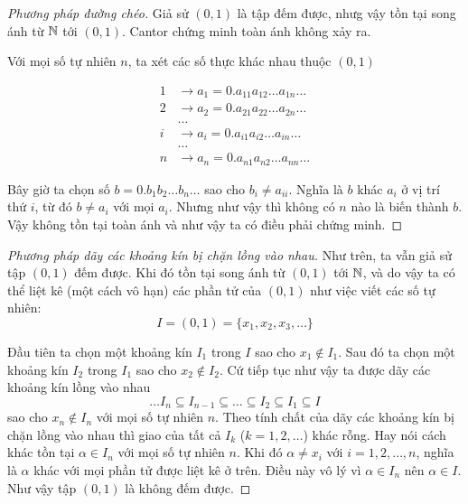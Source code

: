 \begin{proof}[Phương pháp đường chéo]
    Giả sử $(0, 1)$ là tập đếm được, nhưg vậy tồn tại song ánh từ $\mathbb{N}$ tới $(0, 1)$.
    Cantor chứng minh toàn ánh không xảy ra.

    Với mọi số tự nhiên $n$, ta xét các số thực khác nhau thuộc $(0, 1)$

    \begin{align*}
        1 & \to a_1 = 0.a_{11} a_{12} \ldots a_{1n} \ldots \\
        2 & \to a_2 = 0.a_{21} a_{22} \ldots a_{2n} \ldots \\
        & \ldots \\
        i & \to a_i = 0.a_{i1} a_{i2} \ldots a_{in} \ldots \\
        & \ldots \\
        n & \to a_n = 0.a_{n1} a_{n2} \ldots a_{nn} \ldots
    \end{align*}

    Bây giờ ta chọn số $b = 0.b_1 b_2 \ldots b_n \ldots$ sao cho
    $b_i \neq a_{ii}$. Nghĩa là $b$ khác $a_i$ ở vị trí thứ $i$,
    từ đó $b \neq a_i$ với mọi $a_i$.
    Nhưng như vậy thì không có $n$ nào là biến thành $b$. Vậy không tồn
    tại toàn ánh và như vậy ta có điều phải chứng minh.
\end{proof}

\begin{proof}[Phương pháp dãy các khoảng kín bị chặn lồng vào nhau]
    Như trên, ta vẫn giả sử tập $(0, 1)$ đếm được. Khi đó tồn tại song ánh
    từ $(0, 1)$ tới $\mathbb{N}$, và do vậy ta có thể liệt kê (một cách vô hạn)
    các phần tử của $(0, 1)$ như việc viết các số tự nhiên:
    \[I = (0, 1) = \{x_1, x_2, x_3, \ldots \}\]

    Đầu tiên ta chọn một khoảng kín $I_1$ trong $I$ sao cho $x_1 \not\in I_1$.
    Sau đó ta chọn một khoảng kín $I_2$ trong $I_1$ sao cho $x_2 \not\in I_2$.
    Cứ tiếp tục như vậy ta được dãy các khoảng kín lồng vào nhau
    \[ \ldots I_n \subseteq I_{n-1} \subseteq \ldots \subseteq I_2 \subseteq I_1 \subseteq I\]
    sao cho $x_n \not\in I_n$ với mọi số tự nhiên $n$. Theo tính chất của dãy 
    các khoảng kín bị chặn lồng vào nhau thì giao của tất cả $I_k$ ($k = 1, 2, \ldots $)
    khác rỗng. Hay nói cách khác tồn tại $\alpha \in I_n$ với mọi số tự nhiên
    $n$. Khi đó $\alpha \neq x_i$ với $i=1, 2, \ldots, n$, nghĩa là $\alpha$
    khác với mọi phần tử được liệt kê ở trên. Điều này vô lý vì $\alpha \in I_n$ nên
    $\alpha \in I$. Như vậy tập $(0, 1)$ là không đếm được.
\end{proof}

